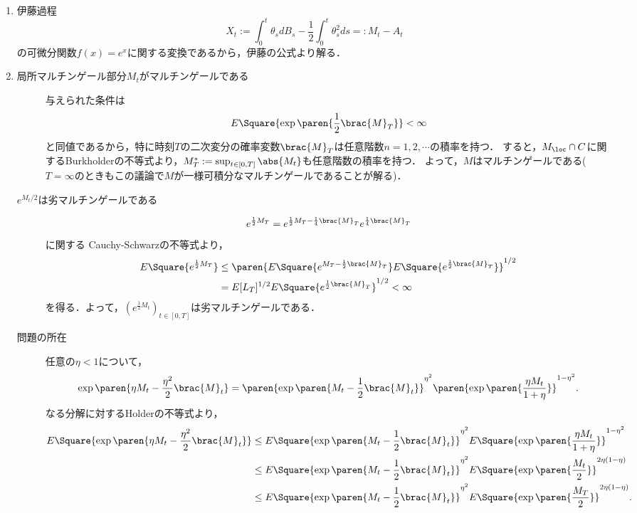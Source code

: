 \documentclass[uplatex,dvipdfmx]{jsreport}
\begin{document}
\begin{Proof}\mbox{}
    \begin{enumerate}
        \item 伊藤過程
        \[X_t:=\int^t_0\theta_sdB_s-\frac{1}{2}\int^t_0\theta^2_sds=:M_t-A_t\]
        の可微分関数$f(x)=e^x$に関する変換であるから，伊藤の公式より解る．
        \item 
        \begin{description}
            \item[局所マルチンゲール部分$M_t$がマルチンゲールである] 与えられた条件は
            \[E\Square{\exp\paren{\frac{1}{2}\brac{M}_T}}<\infty\]
            と同値であるから，特に時刻$T$の二次変分の確率変数$\brac{M}_T$は任意階数$n=1,2,\cdots$の積率を持つ．
            すると，$M_\loc\cap C$に関するBurkholderの不等式より，$M^*_T:=\sup_{t\in[0,T]}\abs{M_t}$も任意階数の積率を持つ．
            よって，$M$はマルチンゲールである($T=\infty$のときもこの議論で$M$が一様可積分なマルチンゲールであることが解る)．
            \item[$e^{M_t/2}$は劣マルチンゲールである] 
            \[e^{\frac{1}{2}M_T}=e^{\frac{1}{2}M_T-\frac{1}{4}\brac{M}_T}e^{\frac{1}{4}\brac{M}_T}\]
            に関する
            Cauchy-Schwarzの不等式より，
            \begin{align*}
                E\Square{e^{\frac{1}{2}M_T}}&\le\paren{E\Square{e^{M_T-\frac{1}{2}\brac{M}_T}}E\Square{e^{\frac{1}{2}\brac{M}_T}}}^{1/2}\\
                &=E[L_T]^{1/2}E\Square{e^{\frac{1}{2}\brac{M}_T}}^{1/2}<\infty
            \end{align*}
            を得る．よって，$(e^{\frac{1}{2}M_t})_{t\in[0,T]}$は劣マルチンゲールである．
            \item[問題の所在] 任意の$\eta<1$について，
            \[\exp\paren{\eta M_t-\frac{\eta^2}{2}\brac{M}_t}=\paren{\exp\paren{M_t-\frac{1}{2}\brac{M}_t}}^{\eta^2}\paren{\exp\paren{\frac{\eta M_t}{1+\eta}}}^{1-\eta^2}.\]
            なる分解に対するHolderの不等式より，
            \begin{align*}
                E\Square{\exp\paren{\eta M_t-\frac{\eta^2}{2}\brac{M}_t}}&\le E\Square{\exp\paren{M_t-\frac{1}{2}\brac{M}_t}}^{\eta^2}E\Square{\exp\paren{\frac{\eta M_t}{1+\eta}}}^{1-\eta^2}\\
                &\le E\Square{\exp\paren{M_t-\frac{1}{2}\brac{M}_t}}^{\eta^2}E\Square{\exp\paren{\frac{M_t}{2}}}^{2\eta(1-\eta)}\\
                &\le E\Square{\exp\paren{M_t-\frac{1}{2}\brac{M}_t}}^{\eta^2}E\Square{\exp\paren{\frac{M_T}{2}}}^{2\eta(1-\eta)}.

\end{align*}
\end{description}
\end{enumerate}
\end{Proof}
\end{document}

